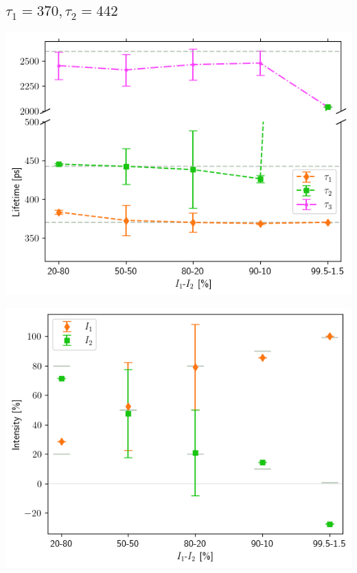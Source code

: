 \subsection{\boldmath$\tau_1=370, \tau_2=442$\unboldmath}

\begin{minipage}{.47\linewidth}
     
    \includegraphics[width=\linewidth]{Batch 6/3-life/lifetimes.png}
    \label{fig:370-440-3life}
\end{minipage}
\hfill
\begin{minipage}{.47\linewidth}
     
    \includegraphics[width=\linewidth]{Batch 6/3-life/intensities.png}
    \label{fig:370-440-3lifeint}
\end{minipage}
